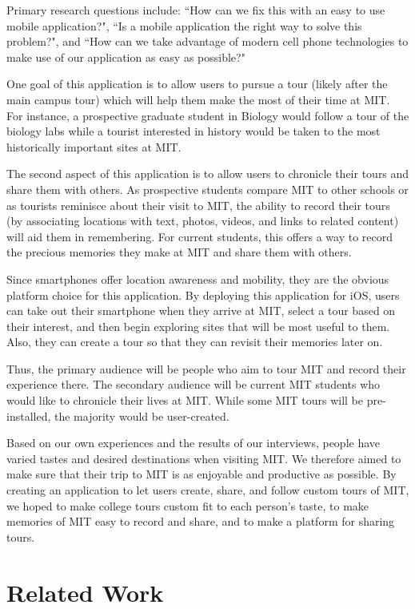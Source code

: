 \documentclass{sigchi}
\begin{document}
Primary research questions include: ``How can we fix this with an easy to use mobile application?", ``Is a mobile application the right way to solve this problem?", and ``How can we take advantage of modern cell phone technologies to make use of our application as easy as possible?"

One goal of this application is to allow users to pursue a tour (likely after the main campus tour) which will help them make the most of their time at MIT. For instance, a prospective graduate student in Biology would follow a tour of the biology labs while a tourist interested in history would be taken to the most historically important sites at MIT. 

The second aspect of this application is to allow users to chronicle their tours and share them with others. As prospective students compare MIT to other schools or as tourists reminisce about their visit to MIT, the ability to record their tours (by associating locations with text, photos, videos, and links to related content) will aid them in remembering. For current students, this offers a way to record the precious memories they make at MIT and share them with others.

Since smartphones offer location awareness and mobility, they are the obvious platform choice for this application. By deploying this application for iOS, users can take out their smartphone when they arrive at MIT, select a tour based on their interest, and then begin exploring sites that will be most useful to them. Also, they can create a tour so that they can revisit their memories later on. 

Thus, the primary audience will be people who aim to tour MIT and record their experience there. The secondary audience will be current MIT students who would like to chronicle their lives at MIT. While some MIT tours will be pre-installed, the majority would be user-created. 

Based on our own experiences and the results of our interviews, people have varied tastes and desired destinations when visiting MIT. We therefore aimed to make sure that their trip to MIT is as enjoyable and productive as possible. By creating an application to let users create, share, and follow custom tours of MIT, we hoped to make college tours custom fit to each person's taste, to make memories of MIT easy to record and share, and to make a platform for sharing tours.

\section{Related Work}
\end{document}
